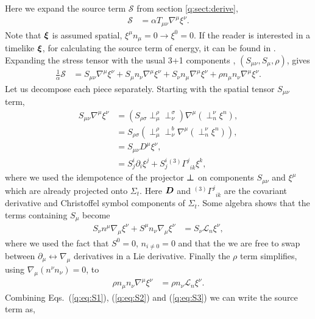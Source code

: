 Here we expand the source term $\mathcal{S}$ from section \ref{q:sect:derive},
\begin{align}
\mathcal{S} &= \alpha T_{\mu\nu} \nabla^\mu \xi^\nu.
\end{align}
Note that $\boldsymbol{\xi}$ is assumed spatial, $\xi^\mu n_\mu = 0\rightarrow \xi^0=0$. If the reader is interested in a timelike $\boldsymbol{\xi}$, for calculating the source term of energy, it can be found in \cite{Clough_2021}. Expanding the stress tensor with the usual 3+1 components \cite{gourgoulhon20073+}, \cite{alcubierre2008introduction} $(S_{\mu\nu}, S_{\mu}, \rho)$, gives
\begin{align}
\frac{1}{\alpha}\mathcal{S} &= S_{\mu\nu}\nabla^\mu \xi^\nu + S_\mu n_\nu \nabla^\mu \xi^\nu + S_\nu n_\mu \nabla^\mu \xi^\nu + \rho n_\mu n_\nu\nabla^\mu \xi^\nu.
\end{align}
Let us decompose each piece separately. Starting with the spatial tensor $S_{\mu\nu}$ term,
\begin{align}
S_{\mu\nu}\nabla^\mu \xi^\nu &= (S_{\rho \sigma}\perp^\rho _\mu \perp^\sigma_\nu )\nabla^\mu ( \perp^\nu_n \xi^n ),  \\
&= S_{\rho \sigma}(\perp^\rho _\mu \perp^b_\nu \nabla^\mu ( \perp^\nu_n \xi^n )),  \\
&= S_{\mu\nu} D^\mu \xi^\nu, \\
&= S^i_{j}\partial_i \xi^j + S^i_{j} {}^{(3)}\Gamma^j_{\,\,\,i k} \xi^k,
\label{q:eq:S1}
\end{align}
where we used the idempotence of the projector $\boldsymbol{\perp}$ on components
$S_{\mu\nu}$ and $\xi^\mu$ which are already projected onto $\Sigma_t$.
Here $\boldsymbol{D}$ and ${}^{(3)}\Gamma^j_{\,\,\,i k}$ are the covariant derivative
and Christoffel symbol components of $\Sigma_t$. Some algebra shows that the terms containing $S_\mu$ become
\begin{align}
\label{q:eq:S2}S_\nu n^\mu \nabla_\mu \xi^\nu + S^\mu n_\nu \nabla_\mu \xi^\nu  &= S_\nu \mathcal{L}_n \xi^\nu,
\end{align}
where we used the fact that $S^0 = 0$, $n_{i\neq0}=0$ and that the we are free to swap between $\partial_\mu \leftrightarrow \nabla_\mu$ derivatives in a Lie derivative. Finally the $\rho$ term simplifies, using $\nabla_\mu (n^\nu n_\nu) = 0$, to
\begin{align} \label{q:eq:S3}
\rho n_\mu n_\nu\nabla^\mu \xi^\nu &= \rho n_\nu \mathcal{L}_n \xi^\nu.
\end{align}
Combining Eqs.~(\ref{q:eq:S1}), (\ref{q:eq:S2}) and (\ref{q:eq:S3}) we can write the source term as,
